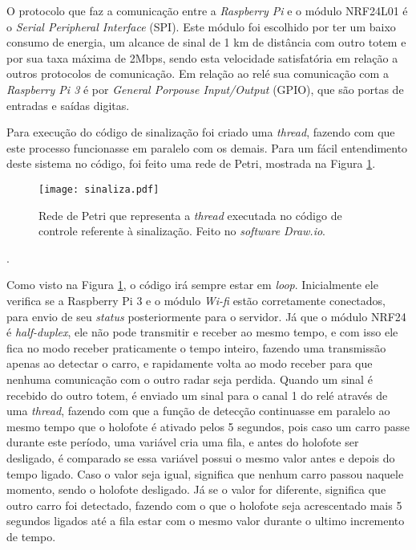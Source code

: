 O protocolo que faz a comunicação entre a \emph{Raspberry Pi} e o módulo NRF24L01 é o \emph{Serial Peripheral Interface} (SPI). Este módulo foi escolhido por ter um baixo consumo de energia, um alcance de sinal de 1 km de distância com outro totem e por sua taxa máxima de 2Mbps, sendo esta velocidade satisfatória em relação a outros protocolos de comunicação. Em relação ao relé sua comunicação com a \emph{Raspberry Pi 3} é por \emph{General Porpouse Input/Output} (GPIO), que são portas de entradas e saídas digitas.  \par
Para execução do código de sinalização foi criado uma \emph{thread}, fazendo com que este processo funcionasse em paralelo com os demais. Para um fácil entendimento deste sistema no código, foi feito uma rede de Petri, mostrada na Figura \ref{Petrisinaliza}.

\begin{figure}[H]
    \centering
    \texttt{[image: sinaliza.pdf]}
    \caption{Rede de Petri que representa a \emph{thread} executada no código de controle referente à sinalização. Feito no \emph{software Draw.io}.}
    \label{Petrisinaliza}
\end{figure}. 

Como visto na Figura \ref{Petrisinaliza}, o código irá sempre estar em \emph{loop}. Inicialmente ele verifica se a Raspberry Pi 3 e o módulo \emph{Wi-fi} estão corretamente conectados, para envio de seu \emph{status} posteriormente para o servidor. Já que o módulo NRF24 é \emph{half-duplex}, ele não pode transmitir e receber ao mesmo tempo, e com isso ele fica no modo receber praticamente o tempo inteiro, fazendo uma transmissão apenas ao detectar o carro, e rapidamente volta ao modo receber para que nenhuma comunicação com o outro radar seja perdida. Quando um sinal é recebido do outro totem, é enviado um sinal para o canal 1 do relé através de uma \emph{thread}, fazendo com que a função de detecção continuasse em paralelo ao mesmo tempo que o holofote é ativado pelos 5 segundos, pois caso um carro passe durante este período, uma variável cria uma fila, e antes do holofote ser desligado, é comparado se essa variável possui o mesmo valor antes e depois do tempo ligado. Caso o valor seja igual, significa que nenhum carro passou naquele momento, sendo o holofote desligado. Já se o valor for diferente, significa que outro carro foi detectado, fazendo com o que o holofote seja acrescentado mais 5 segundos ligados até a fila estar com o mesmo valor durante o ultimo incremento de tempo.

